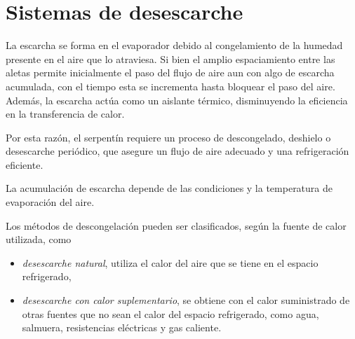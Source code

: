 			
	
	\section{Sistemas de desescarche}
		
		La escarcha se forma en el evaporador debido al congelamiento de la humedad presente en el aire que lo atraviesa. Si bien el amplio espaciamiento entre las aletas permite inicialmente el paso del flujo de aire aun con algo de escarcha acumulada, con el tiempo esta se incrementa hasta bloquear el paso del aire. Además, la escarcha actúa como un aislante térmico, disminuyendo la eficiencia en la transferencia de calor. 
		
		Por esta razón, el serpentín requiere un proceso de descongelado, deshielo o desescarche periódico, que asegure un flujo de aire adecuado y una refrigeración eficiente.
		
		La acumulación de escarcha depende de las condiciones y la temperatura de evaporación del aire.
		
		Los métodos de descongelación pueden ser clasificados, según la fuente de calor utilizada, como
			\begin{itemize}
				\item \emph{desescarche natural},  utiliza el calor del aire que se tiene en el espacio refrigerado,
				\item \emph{desescarche con calor suplementario}, se obtiene con el calor suministrado de otras fuentes que no sean el calor del espacio refrigerado, como agua, salmuera, resistencias eléctricas y gas caliente.
			\end{itemize}
			
